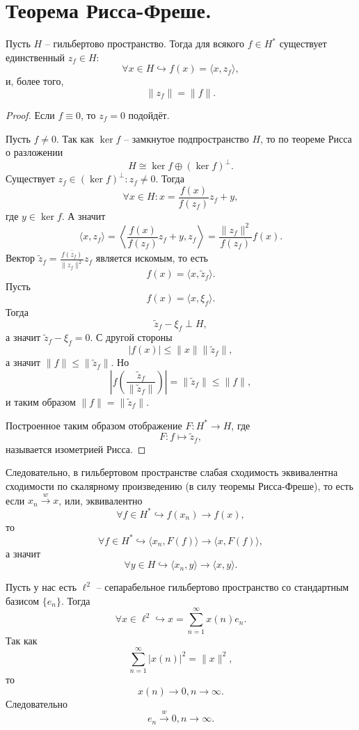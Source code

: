 \section{Теорема Рисса-Фреше.}\label{seq:riesz-frechet}
\begin{theorem}
    Пусть $H$ -- гильбертово пространство.
    Тогда для всякого $f \in H^*$ существует единственный $z_f \in H\colon $
    \[
        \forall x \in H \hookrightarrow f(x) = \langle x, z_f \rangle,
    \]
    и, более того,
    \[
        \|z_f\| = \|f\|.
    \]
\end{theorem}
\begin{proof}
    Если $f \equiv 0$, то $z_f = 0$ подойдёт.

    Пусть $f \neq 0$.
    Так как $\ker f$ -- замкнутое подпространство $H$, то по теореме Рисса о разложении
    \[
        H \cong \ker f \oplus \left(\ker f\right)^{\perp}.
    \]
    Существует $z_f \in \left(\ker f\right)^{\perp}\colon z_f \neq 0$.
    Тогда
    \[
        \forall x \in H\colon x = \frac{f(x)}{f(z_f)}z_f + y,
    \]
    где $y \in \ker f$.
    А значит
    \[
        \langle x, z_f \rangle = \left\langle \frac{f(x)}{f(z_f)}z_f + y, z_f \right\rangle = \frac{\|z_f\|^2}{f(z_f)}f(x).
    \]
    Вектор $\tilde{z}_f = \frac{\overline{f(z_f)}}{\|z_f\|^2}z_f$ является искомым, то есть
    \[
        f(x) = \langle x, \tilde{z}_f \rangle.
    \]
    Пусть
    \[
        f(x) = \langle x, \xi_f \rangle.
    \]
    Тогда
    \[
        \tilde{z}_f - \xi_f \perp H,
    \]
    а значит $\tilde{z}_f - \xi_f = 0$.
    С другой стороны
    \[
        |f(x)| \leq \|x\|\|\tilde{z}_f\|,
    \]
    а значит $\|f\| \leq \|\tilde{z}_f\|$.
    Но
    \[
        \left|f\left(\frac{\tilde{z}_f}{\|\tilde{z}_f\|}\right)\right| = \|\tilde{z}_f\| \leq \|f\|,
    \]
    и таким образом $\|f\| = \|\tilde{z}_f\|$.

    Построенное таким образом отображение $F\colon H^* \to H$, где
    \[
        F\colon f \mapsto \tilde{z}_f,
    \]
    называется изометрией Рисса.
\end{proof}
\begin{example}
    Следовательно, в гильбертовом пространстве слабая сходимость эквивалентна сходимости по скалярному произведению (в силу теоремы Рисса-Фреше), то есть если $x_n \xrightarrow{w} x$, или, эквивалентно
    \[
        \forall f \in H^* \hookrightarrow f(x_n) \rightarrow f(x),
    \]
    то
    \[
        \forall f \in H^* \hookrightarrow \langle x_n, F(f) \rangle \rightarrow \langle x, F(f) \rangle,
    \]
    а значит
    \[
        \forall y \in H \hookrightarrow \langle x_n, y \rangle \rightarrow \langle x, y \rangle.
    \]
\end{example}
\begin{example}
    Пусть у нас есть $\ell^2$ -- сепарабельное гильбертово пространство со стандартным базисом $\{e_n\}$.
    Тогда
    \[
        \forall x \in \ell^2 \hookrightarrow x = \sum_{n = 1}^{\infty} x(n)e_n.
    \]
    Так как
    \[
        \sum_{n = 1}^{\infty} |x(n)|^2 = \|x\|^2,
    \]
    то
    \[
        x(n) \rightarrow 0, n \rightarrow \infty.
    \]
    Следовательно
    \[
        e_n \xrightarrow{w} 0, n \rightarrow \infty.
    \]
\end{example}

